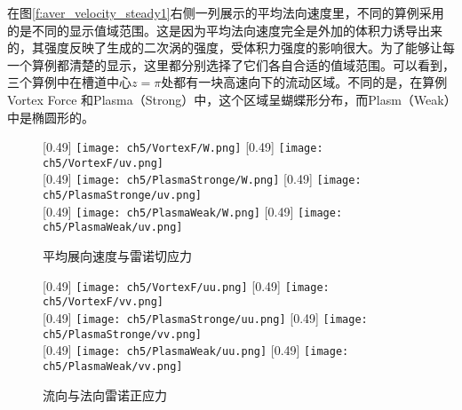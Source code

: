 在图\ref{f:aver_velocity_steady1}右侧一列展示的平均法向速度里，不同的算例采用的是不同的显示值域范围。这是因为平均法向速度完全是外加的体积力诱导出来的，其强度反映了生成的二次涡的强度，受体积力强度的影响很大。为了能够让每一个算例都清楚的显示，这里都分别选择了它们各自合适的值域范围。可以看到，三个算例中在槽道中心$z=\pi$处都有一块高速向下的流动区域。不同的是，在算例Vortex Force 和Plasma（Strong）中，这个区域呈蝴蝶形分布，而Plasm（Weak）中是椭圆形的。
\begin{figure}[htb]
  \centering
  [0.49\textwidth]
    {\texttt{[image: ch5/VortexF/W.png]}}
  [0.49\textwidth]
    {\texttt{[image: ch5/VortexF/uv.png]}}
  \\\bigskip
  [0.49\textwidth]
    {\texttt{[image: ch5/PlasmaStronge/W.png]}}
  [0.49\textwidth]
    {\texttt{[image: ch5/PlasmaStronge/uv.png]}}
  \\\bigskip
  [0.49\textwidth]
    {\texttt{[image: ch5/PlasmaWeak/W.png]}}
  [0.49\textwidth]
    {\texttt{[image: ch5/PlasmaWeak/uv.png]}}
  \caption{平均展向速度与雷诺切应力}\label{f:aver_velocity_steady2}
\end{figure}
\begin{figure}[htb]
  \centering
  [0.49\textwidth]
    {\texttt{[image: ch5/VortexF/uu.png]}}
  [0.49\textwidth]
    {\texttt{[image: ch5/VortexF/vv.png]}}
  \\\bigskip
  [0.49\textwidth]
    {\texttt{[image: ch5/PlasmaStronge/uu.png]}}
  [0.49\textwidth]
    {\texttt{[image: ch5/PlasmaStronge/vv.png]}}
  \\\bigskip
  [0.49\textwidth]
    {\texttt{[image: ch5/PlasmaWeak/uu.png]}}
  [0.49\textwidth]
    {\texttt{[image: ch5/PlasmaWeak/vv.png]}}
  \caption{流向与法向雷诺正应力}\label{f:aver_velocity_steady3}
\end{figure}

